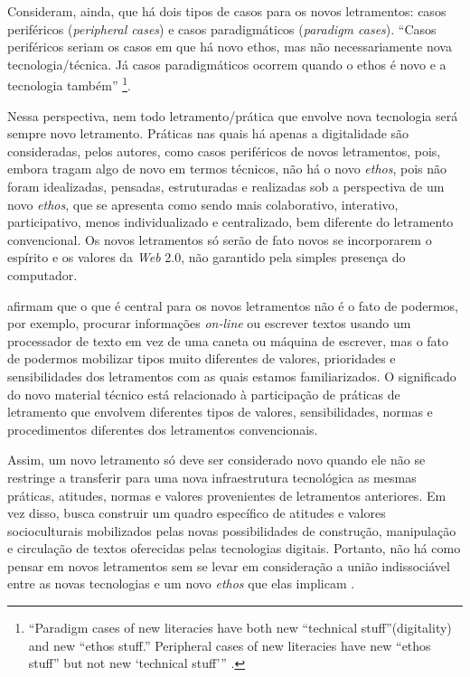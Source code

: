 \documentclass{textolivre}
\begin{document}
Consideram, ainda, que há dois tipos de casos para os novos letramentos: casos
periféricos (\emph{peripheral cases}) e casos paradigmáticos (\emph{paradigm
cases}). “Casos periféricos seriam os casos em que há novo ethos, mas não
necessariamente nova tecnologia/técnica. Já casos paradigmáticos ocorrem quando
o ethos é novo e a tecnologia também” \cite[p. 7, tradução nossa]{knobel2007}\footnote{
“Paradigm cases of new literacies have both new
“technical stuff”(digitality) and new “ethos stuff.” Peripheral cases of new
literacies have new “ethos stuff” but not new ‘technical stuff’” \cite[p.
7]{knobel2007}.
}.

Nessa perspectiva, nem todo letramento/prática que envolve nova tecnologia será
sempre novo letramento. Práticas nas quais há apenas a digitalidade são
consideradas, pelos autores, como casos periféricos de novos letramentos, pois,
embora tragam algo de novo em termos técnicos, não há o novo \emph{ethos}, pois
não foram idealizadas, pensadas, estruturadas e realizadas sob a perspectiva de
um novo \emph{ethos}, que se apresenta como sendo mais colaborativo,
interativo, participativo, menos individualizado e centralizado, bem diferente
do letramento convencional. Os novos letramentos só serão de fato novos se
incorporarem o espírito e os valores da \emph{Web} 2.0, não garantido pela
simples presença do computador.

\textcite{knobel2007} afirmam que o que é central para os novos letramentos
não é o fato de podermos, por exemplo, procurar informações \emph{on-line} ou escrever
textos usando um processador de texto em vez de uma caneta ou máquina de
escrever, mas o fato de podermos mobilizar tipos muito diferentes de valores,
prioridades e sensibilidades dos letramentos com as quais estamos
familiarizados. O significado do novo material técnico está relacionado à
participação de práticas de letramento que envolvem diferentes tipos de
valores, sensibilidades, normas e procedimentos diferentes dos letramentos
convencionais.

Assim, um novo letramento só deve ser considerado novo quando ele não se
restringe a transferir para uma nova infraestrutura tecnológica as mesmas
práticas, atitudes, normas e valores provenientes de letramentos anteriores. Em
vez disso, busca construir um quadro específico de atitudes e valores
socioculturais mobilizados pelas novas possibilidades de construção,
manipulação e circulação de textos oferecidas pelas tecnologias digitais.
Portanto, não há como pensar em novos letramentos sem se levar em consideração
a união indissociável entre as novas tecnologias e um novo \emph{ethos} que elas
implicam \cite{maia2013}.
\end{document}
